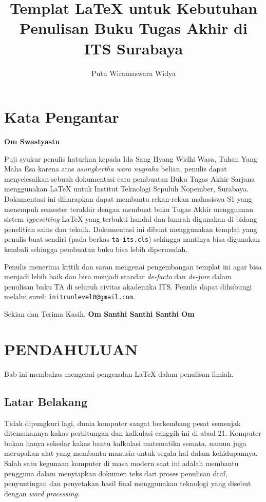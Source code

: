 \documentclass{ta-its}
\title{Templat \LaTeX{} untuk Kebutuhan Penulisan Buku Tugas Akhir di ITS Surabaya}{A \LaTeX{} Template for Setting Up a Final Project Booklet for ITS Surabaya}{Kxxxxx}
\author{Putu Wiramaswara Widya}{5111100012}
\begin{document}
    \frontmatter %
    \maketitle
    \chapter{Kata Pengantar}
        \textbf{Om Swastyastu}

        Puji syukur penulis haturkan kepada Ida Sang Hyang Widhi Wasa, Tuhan Yang Maha Esa karena atas \emph{asungkertha wara nugraha} beliau, penulis dapat menyelesaikan sebuah dokumentasi cara pembuatan Buku Tugas Akhir Sarjana menggunakan \LaTeX{} untuk Institut Teknologi Sepuluh Nopember, Surabaya. Dokumentasi ini diharapkan dapat membantu rekan-rekan mahasiswa S1 yang menempuh semester terakhir dengan membuat buku Tugas Akhir menggunaan sistem \emph{typesetting} \LaTeX{} yang terbukti handal dan lumrah digunakan di bidang penelitian sains dan teknik. Dokumentasi ini dibuat menggunakan templat yang penulis buat sendiri (pada berkas \texttt{ta-its.cls}) sehingga nantinya bisa digunakan kembali sehingga pembuatan buku bisa lebih dipermudah.

        Penulis menerima kritik dan saran mengenai pengembangan templat ini agar bisa menjadi lebih baik dan bisa menjadi standar \emph{de-facto} dan \emph{de-jure} dalam penulisan buku TA di seluruh civitas akademika ITS. Penulis dapat dihubungi melalui surel: \texttt{initrunlevel0@gmail.com}.

        Sekian dan Terima Kasih.
        \noindent \textbf{Om Santhi Santhi Santhi Om}

        \cleardoublepage %

    \tableofcontents %
    \listoftables %
    \listoffigures %

\mainmatter %
    \chapter{PENDAHULUAN}
        Bab ini membahas mengenai pengenalan \LaTeX{} dalam penulisan ilmiah.

        \section{Latar Belakang}
            Tidak dipungkuri lagi, dunia komputer sangat berkembang pesat semenjak ditemukannya kakas perhitungan dan kalkulasi canggih ini di abad 21. Komputer bukan hanya sekedar kakas bantu kalkulasi matematika semata, namun juga merupakan alat yang membantu manusia untuk segala hal dalam kehidupannya. Salah satu kegunaan komputer di masa modern saat ini adalah membantu pengguna dalam menyiapkan dokumen teks dari proses penulisan draf, penyuntingan dan penyetakan hasil final menggunakan teknologi yang disebut dengan \emph{word processing}.
            
\end{document}
